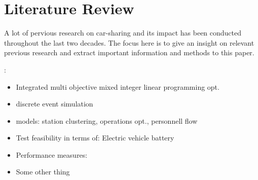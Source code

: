 \clearpage
\section{Literature Review}
\label{sec:lr}

A lot of pervious research on car-sharing and its impact has been conducted throughout
the last two decades. The focus here is to give an insight on relevant previous
research and extract important information and methods to this paper.

\cite{OptSimFramework}:
\begin{itemize}
    \item Integrated multi objective mixed integer linear programming opt.
    \item discrete event simulation
    \item models: station clustering, operations opt., personnell flow 
    \item Test feasibility in terms of: Electric vehicle battery
    \item Performance measures: 
    \item Some other thing
\end{itemize}
    
